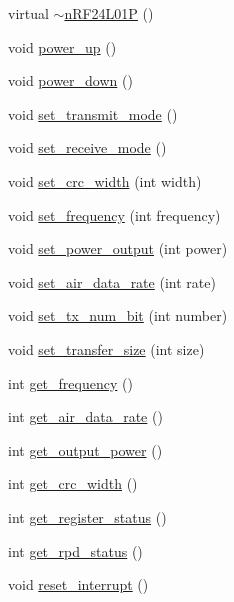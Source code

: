 \begin{DoxyCompactItemize}
\item 
virtual \hyperlink{classnRF24L01P_a18e685e841a2913134c831d8bb47f65c}{$\sim$n\+R\+F24\+L01\+P} ()
\item 
void \hyperlink{classnRF24L01P_a332330503d3db37c1c587e4ffc15c8a4}{power\+\_\+up} ()
\item 
void \hyperlink{classnRF24L01P_a44931f1ceb0e36589f61231d81d1c6cc}{power\+\_\+down} ()
\item 
void \hyperlink{classnRF24L01P_a008b0f101fcf7805444b7301797ec0cb}{set\+\_\+transmit\+\_\+mode} ()
\item 
void \hyperlink{classnRF24L01P_abd38cb7afd495a6a688eca0b09da681c}{set\+\_\+receive\+\_\+mode} ()
\item 
void \hyperlink{classnRF24L01P_a6eb8c98ca0a1623d59a54a86128ba8c2}{set\+\_\+crc\+\_\+width} (int width)
\item 
void \hyperlink{classnRF24L01P_ac98a4af9b12f59460ac7825df8d527ea}{set\+\_\+frequency} (int frequency)
\item 
void \hyperlink{classnRF24L01P_af0ffe56f76410aba9f6de58c03905d20}{set\+\_\+power\+\_\+output} (int power)
\item 
void \hyperlink{classnRF24L01P_ad40540239b3323a652b76584750fc1a4}{set\+\_\+air\+\_\+data\+\_\+rate} (int rate)
\item 
void \hyperlink{classnRF24L01P_abe98863bd13940a3c1a3609ec2892bfd}{set\+\_\+tx\+\_\+num\+\_\+bit} (int number)
\item 
void \hyperlink{classnRF24L01P_aa26c3a434e07f84c17fa4a85a6480dc0}{set\+\_\+transfer\+\_\+size} (int size)
\item 
int \hyperlink{classnRF24L01P_af9e82453635e4bfd5fdec9547c2eceaa}{get\+\_\+frequency} ()
\item 
int \hyperlink{classnRF24L01P_a96fdcb9be4d10d74693d7e368b8a0905}{get\+\_\+air\+\_\+data\+\_\+rate} ()
\item 
int \hyperlink{classnRF24L01P_addc00e66d2e39267db4867d1aec22b20}{get\+\_\+output\+\_\+power} ()
\item 
int \hyperlink{classnRF24L01P_ae30efc5f2832d8fee2e8ae9de336805b}{get\+\_\+crc\+\_\+width} ()
\item 
int \hyperlink{classnRF24L01P_ae7923050ab9dfc6b3cef7b729e63c0bd}{get\+\_\+register\+\_\+status} ()
\item 
int \hyperlink{classnRF24L01P_a7d5f282bc872e34b739b1ec9e49e076c}{get\+\_\+rpd\+\_\+status} ()
\item 
void \hyperlink{classnRF24L01P_a6488b9b862324ae4f7f190cb9e5f7324}{reset\+\_\+interrupt} ()

\end{DoxyCompactItemize}
